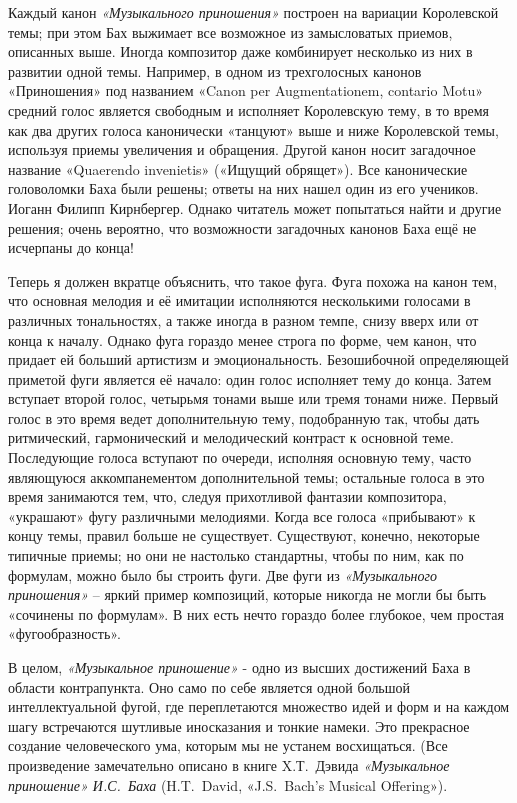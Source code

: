 \documentclass[../main.tex]{subfiles}
\begin{document}
Каждый канон \emph{«Музыкального приношения»} построен на вариации Королевской темы; при этом Бах выжимает все возможное из замысловатых приемов, описанных выше. Иногда композитор даже комбинирует несколько из них в развитии одной темы. Например, в одном из трехголосных канонов «Приношения» под названием «Canon per Augmentationem, contario Motu» средний голос является свободным и исполняет Королевскую тему, в то время как два других голоса канонически «танцуют» выше и ниже Королевской темы, используя приемы увеличения и обращения. Другой канон носит загадочное название «Quaerendo invenietis» («Ищущий обрящет»). Все канонические головоломки Баха были решены; ответы на них нашел один из его учеников. Иоганн Филипп Кирнбергер. Однако читатель может попытаться найти и другие решения; очень вероятно, что возможности загадочных канонов Баха ещё не исчерпаны до конца!

Теперь я должен вкратце объяснить, что такое фуга. Фуга похожа на канон тем, что основная мелодия и её имитации исполняются несколькими голосами в различных тональностях, а также иногда в разном темпе, снизу вверх или от конца к началу. Однако фуга гораздо менее строга по форме, чем канон, что придает ей больший артистизм и эмоциональность. Безошибочной определяющей приметой фуги является её начало: один голос исполняет тему до конца. Затем вступает второй голос, четырьмя тонами выше или тремя тонами ниже. Первый голос в это время ведет дополнительную тему, подобранную так, чтобы дать ритмический, гармонический и мелодический контраст к основной теме. Последующие голоса вступают по очереди, исполняя основную тему, часто являющуюся аккомпанементом дополнительной темы; остальные голоса в это время занимаются тем, что, следуя прихотливой фантазии композитора, «украшают» фугу различными мелодиями. Когда все голоса «прибывают» к концу темы, правил больше не существует. Существуют, конечно, некоторые типичные приемы; но они не настолько стандартны, чтобы по ним, как по формулам, можно было бы строить фуги. Две фуги из \emph{«Музыкального приношения»} \--- яркий пример композиций, которые никогда не могли бы быть «сочинены по формулам». В них есть нечто гораздо более глубокое, чем простая «фугообразность».

В целом, \emph{«Музыкальное приношение»} - одно из высших достижений Баха в области контрапункта. Оно само по себе является одной большой интеллектуальной фугой, где переплетаются множество идей и форм и на каждом шагу встречаются шутливые иносказания и тонкие намеки. Это прекрасное создание человеческого ума, которым мы не устанем восхищаться. (Все произведение замечательно описано в книге X.Т.~Дэвида \emph{«Музыкальное приношение» И.С.~Баха} (H.T.~David, «J.S.~Bach's Musical Offering»).
\end{document}
